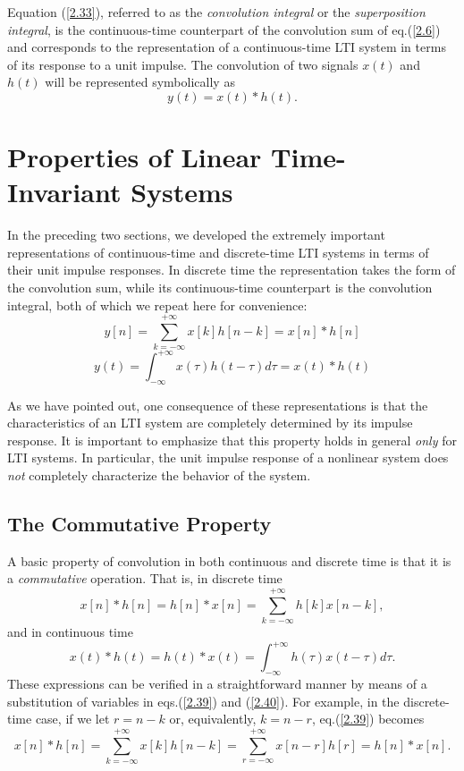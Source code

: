 \documentclass[a4paper,twoside]{book}
\begin{document}
Equation (\ref{2.33}), referred to as the \textit{convolution integral} or the \textit{superposition integral}, is the continuous-time counterpart of the convolution sum of eq.\;(\ref{2.6}) and corresponds to the representation of a continuous-time LTI system in terms of its response to a unit impulse. The convolution of two signals $x(t)$ and $h(t)$ will be represented symbolically as
\begin{equation}
    y(t)=x(t)*h(t).
    \label{2.34}
\end{equation}

\section{Properties of Linear Time-Invariant Systems}

In the preceding two sections, we developed the extremely important representations of continuous-time and discrete-time LTI systems in terms of their unit impulse responses. In discrete time the representation takes the form of the convolution sum, while its continuous-time counterpart is the convolution integral, both of which we repeat here for convenience:
\begin{equation}
    y[n] = \sum_{k=-\infty}^{+\infty}x[k]h[n-k] = x[n]*h[n]
    \label{2.39}
\end{equation}
\begin{equation}
    y(t) = \int_{-\infty}^{+\infty}x(\tau)h(t-\tau)d\tau = x(t)*h(t)
    \label{2.40}
\end{equation}

As we have pointed out, one consequence of these representations is that the characteristics of an LTI system are completely determined by its impulse response. It is important to emphasize that this property holds in general \textit{only} for LTI systems. In particular, the unit impulse response of a nonlinear system does \textit{not} completely characterize the behavior of the system.

\subsection{The Commutative Property}

A basic property of convolution in both continuous and discrete time is that it is a \textit{commutative} operation. That is, in discrete time
\begin{equation}
    x[n]*h[n]= h[n]*x[n] = \sum_{k=-\infty}^{+\infty}h[k]x[n-k],
    \label{2.43}
\end{equation}
and in continuous time
\begin{equation}
    x(t)*h(t)=h(t)*x(t)=\int_{-\infty}^{+\infty}h(\tau)x(t-\tau)d\tau.
    \label{2.44}
\end{equation}
These expressions can be verified in a straightforward manner by means of a substitution of variables in eqs.\;(\ref{2.39}) and (\ref{2.40}). For example, in the discrete-time case, if we let $r=n-k$ or, equivalently, $k=n-r$, eq.\;(\ref{2.39}) becomes
\begin{equation}
    x[n]*h[n]=\sum_{k=-\infty}^{+\infty}x[k]h[n-k]=\sum_{r=-\infty}^{+\infty}x[n-r]h[r]=h[n]*x[n].
    \label{2.45}
\end{equation}
\end{document}
